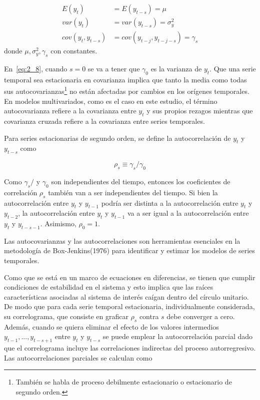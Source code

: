 \begin{align}
\label{eq:2_7}
E(y_t)&=E(y_{t-s})=\mu\\
\label{eq:2_8}
var(y_t)&=var(y_{t-s})=\sigma^2_y\\
\label{eq:2_9}
cov(y_t,y_{t-s})&=cov(y_{t-j},y_{t-j-s})=\gamma_s
\end{align}
donde $\mu, \sigma^2_y, \gamma_s$ con constantes.
   
En~\eqref{eq:2_8}, cuando $s=0$ se va a tener que $\gamma_0$ es la varianza de $y_t$. Que una serie temporal sea estacionaria en covarianza implica que tanto la media como todas sus autocovarianzas\footnote{También se habla de proceso debilmente estacionario o estacionario de segundo orden.} no están afectadas por cambios en los orígenes temporales. En modelos multivariados, como es el caso en este estudio, el término autocovarianza refiere a la covarianza entre $y_t$ y sus propios rezagos mientras que covarianza cruzada refiere a la covarianza entre series temporales.

Para series estacionarias de segundo orden, se define la autocorrelación de $y_t$ y $y_{t-s}$ como

\begin{equation*}
\rho_s\equiv\gamma_s/\gamma_0
\end{equation*} 

Como $\gamma_s/$ y $\gamma_0$ son independientes del tiempo, entonces los coeficientes de correlación $\rho_s$ también van a ser independientes del tiempo. Si bien la autocorrelación entre $y_t$ y $y_{t-1}$ podría ser distinta a la autocorrelación entre $y_t$ y $y_{t-2}$, la autocorrelación entre $y_t$ y $y_{t-1}$ va a ser igual a la autocorrelación entre $y_t$ y $y_{t-s-1}$. Asimismo, $\rho_0=1$.

Las autocovarianzas y las autocorrelaciones son herramientas esenciales en la metodología de Box-Jenkins(1976) para identificar y estimar los modelos de series temporales. 


Como que se está en un marco de ecuaciones en diferencias, se tienen que cumplir condiciones de estabilidad en el sistema y esto implica que las raíces características asociadas al sistema de interés caígan dentro del círculo unitario. De modo que para cada serie temporal estacionaria, individualmente considerada, su correlograma, que consiste en graficar $\rho_s$ contra $s$ debe converger a cero.  Además, cuando se quiera eliminar el efecto de los valores intermedios $y_{t-1}, ..., y_{t-s+1}$  entre  $y_t$ y $y_{t-s}$ se puede emplear la autocorrelación parcial dado que el correlograma incluye las correlaciones indirectas del proceso autorregresivo. Las autocorrelaciones parciales se calculan como


